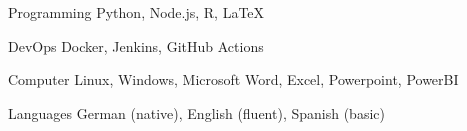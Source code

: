 

\begin{cvskills}

  \cvskill
    {Programming} %
    {Python, Node.js, R, LaTeX} %

  \cvskill
    {DevOps} %
    {Docker, Jenkins, GitHub Actions} %

  \cvskill
    {Computer} %
    {Linux, Windows, Microsoft Word, Excel, Powerpoint, PowerBI} %

  \cvskill
    {Languages} %
    {German (native), English (fluent), Spanish (basic)} %


\end{cvskills}
